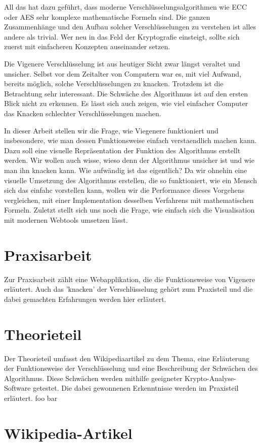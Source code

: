 \documentclass[11pt,paper=a4,final]{scrartcl}
\begin{document}
All das hat dazu gef\"uhrt, dass moderne Verschl\"usselungsalgorithmen wie ECC oder AES sehr komplexe mathematische Formeln sind. Die ganzen Zusammenh\"ange und den Aufbau solcher Verschl\"usselungen zu verstehen ist alles andere als trivial. Wer neu in das Feld der Kryptografie einsteigt, sollte sich zuerst mit einfacheren Konzepten auseinander setzen.

Die Vigenere Verschl\"usselung ist aus heutiger Sicht zwar l\"angst veraltet und unsicher. Selbst vor dem Zeitalter von Computern war es, mit viel Aufwand, bereits m\"oglich, solche Verschl\"usselungen zu knacken. Trotzdem ist die Betrachtung sehr interessant. Die Schw\"ache des Algorithmus ist auf den ersten Blick nicht zu erkennen. Es l\"asst sich auch zeigen, wie viel einfacher Computer das Knacken schlechter Verschl\"usselungen machen.

In dieser Arbeit stellen wir die Frage, wie Viegenere funktioniert und insbesondere, wie man dessen Funktionsweise einfach verstaendlich machen kann. Dazu soll eine visuelle Repr\"asentation der Funktion des Algorithmus erstellt werden. Wir wollen auch wisse, wieso denn der Algorithmus unsicher ist und wie man ihn knacken kann. Wie aufw\"andig ist das eigentlich? Da wir ohnehin eine visuelle Umsetzung des Algorithmus erstellen, die so funktioniert, wie ein Mensch sich das einfahc vorstellen kann, wollen wir die Performance dieses Vorgehens vergleichen, mit einer Implementation desselben Verfahrens mit mathematischen Formeln. Zuletzt stellt sich uns noch die Frage, wie einfach sich die Visualisation mit modernen Webtools umsetzen l\"asst.
\section{Praxisarbeit}
Zur Praxisarbeit z\"ahlt eine Webapplikation, die die Funktionsweise von Vigenere erl\"autert. Auch das 'knacken' der Verschl\"usselung geh\"ort zum Praxisteil und die dabei gemachten Erfahrungen werden hier erl\"autert.
\section{Theorieteil}
Der Theorieteil umfasst den Wikipediaartikel zu dem Thema, eine Erl\"auterung der Funktionsweise der Verschl\"usselung und eine Beschreibung der Schw\"achen des Algorithmus. Diese Schw\"achen werden mithilfe geeigneter Krypto-Analyse-Software getestet. Die dabei gewonnenen Erkenntnisse werden im Praxisteil erl\"autert.
\newpage
foo bar
\section{Wikipedia-Artikel}
\end{document}
